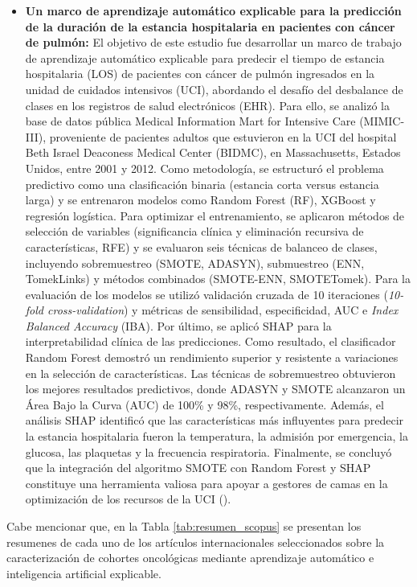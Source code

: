 \begin{itemize}
\item \textbf{Un marco de aprendizaje automático explicable para la predicción de la duración de la estancia hospitalaria en pacientes con cáncer de pulmón:} El objetivo de este estudio fue desarrollar un marco de trabajo de aprendizaje automático explicable para predecir el tiempo de estancia hospitalaria (LOS) de pacientes con cáncer de pulmón ingresados en la unidad de cuidados intensivos (UCI), abordando el desafío del desbalance de clases en los registros de salud electrónicos (EHR). Para ello, se analizó la base de datos pública Medical Information Mart for Intensive Care (MIMIC-III), proveniente de pacientes adultos que estuvieron en la UCI del hospital Beth Israel Deaconess Medical Center (BIDMC), en Massachusetts, Estados Unidos, entre 2001 y 2012. Como metodología, se estructuró el problema predictivo como una clasificación binaria (estancia corta versus estancia larga) y se entrenaron modelos como Random Forest (RF), XGBoost y regresión logística. Para optimizar el entrenamiento, se aplicaron métodos de selección de variables (significancia clínica y eliminación recursiva de características, RFE) y se evaluaron seis técnicas de balanceo de clases, incluyendo sobremuestreo (SMOTE, ADASYN), submuestreo (ENN, TomekLinks) y métodos combinados (SMOTE-ENN, SMOTETomek). Para la evaluación de los modelos se utilizó validación cruzada de 10 iteraciones (\textit{10-fold cross-validation}) y métricas de sensibilidad, especificidad, AUC e \textit{Index Balanced Accuracy} (IBA). Por último, se aplicó SHAP para la interpretabilidad clínica de las predicciones. Como resultado, el clasificador Random Forest demostró un rendimiento superior y resistente a variaciones en la selección de características. Las técnicas de sobremuestreo obtuvieron los mejores resultados predictivos, donde ADASYN y SMOTE alcanzaron un Área Bajo la Curva (AUC) de 100\% y 98\%, respectivamente. Además, el análisis SHAP identificó que las características más influyentes para predecir la estancia hospitalaria fueron la temperatura, la admisión por emergencia, la glucosa, las plaquetas y la frecuencia respiratoria. Finalmente, se concluyó que la integración del algoritmo SMOTE con Random Forest y SHAP constituye una herramienta valiosa para apoyar a gestores de camas en la optimización de los recursos de la UCI (\cite{article16}).
\end{itemize}

Cabe mencionar que, en la Tabla \ref{tab:resumen_scopus} se presentan los resumenes de cada uno de los artículos internacionales seleccionados sobre la caracterización de cohortes oncológicas mediante aprendizaje automático e inteligencia artificial explicable.

